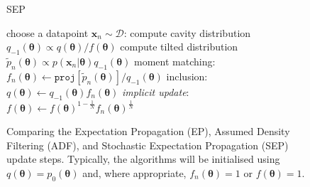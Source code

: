 \begin{figure}[!t]
\begin{minipage}[t]{0.33\linewidth}
\begin{algorithm}[H]
\begin{algorithmic}[1]
\end{algorithmic}
\end{algorithm}
\end{minipage}
\begin{minipage}[t]{0.33\linewidth}
\centering
\begin{algorithm}[H]
\caption{SEP} \small
\label{alg:sep} 
\begin{algorithmic}[1] 
	\STATE choose a datapoint $\bm{x}_n\sim \mathcal{D}$:
	\STATE compute cavity distribution \\ $q_{-1}(\bm{\theta}) \propto q(\bm{\theta}) / f(\bm{\theta})$
	\STATE compute tilted distribution \\$\tilde{p}_n(\bm{\theta}) \propto p(\bm{x}_n|\bm{\theta}) q_{-1}(\bm{\theta})$
	\STATE moment matching: \\\hspace{-1mm}$f_n(\bm{\theta}) \leftarrow \mathtt{proj}[\tilde{p}_n(\bm{\theta})] / q_{-1}(\bm{\theta}) $
	\STATE inclusion:\\ $q(\bm{\theta}) \leftarrow q_{-1}(\bm{\theta}) f_n(\bm{\theta})$
	\STATE \textit{implicit update}:\\ $f(\bm{\theta}) \leftarrow f(\bm{\theta})^{1 - \frac{1}{N}} f_n(\bm{\theta})^{\frac{1}{N}}$
\end{algorithmic}
\end{algorithm}
\end{minipage} 
%
\caption{Comparing the Expectation Propagation (EP), Assumed Density Filtering (ADF), and Stochastic Expectation Propagation (SEP) update steps. Typically, the algorithms will be initialised using $q(\bm{\theta}) = p_0(\bm{\theta})$ and, where appropriate, $f_n(\bm{\theta})=1$ or $f(\bm{\theta})=1$.}
\end{figure}

%
%
